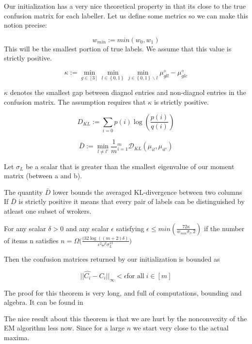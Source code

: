 Our initialization has a very nice theoretical property in that its close to the true confusion matrix for each labeller. Let us define some metrics so we can make this notion precise:

$$ w_{min} := min(w_{0}, w_{1}) $$
This will be the smallest portion of true labels. We assume that this value is strictly positive.

$$ \kappa := \min_{g \in [3]} \min_{l \in \left\{0,1\right\}} \min_{j \in \left\{0,1\right\}\backslash l}  \mu^{\diamond}_{gll} - \mu^{\diamond}_{glc}$$

$\kappa$ denotes the smallest gap between diagnol entries and non-diagnol entries in the confusion matrix. The assumption requires that $\kappa$ is strictly positive.

$$D_{KL} := \displaystyle\sum\limits_{i=0} p(i)\log(\frac{p(i)}{q(i)}) $$

$$\bar{D} := \min_{l \neq l'} \frac{1}{m} \displaystyle_{i=1}^{m} \mathcal{D}_{KL}(\mu_{il},\mu_{il'})$$

Let $\sigma_{L}$ be a scalar that is greater than the smallest eigenvalue of our moment matrix (between a and b).

The quantity $\bar{D}$ lower bounds the averaged KL-divergence between two columns If $\bar{D}$ is strictly positive it means that every pair of labels can be distinguished by atleast one subset of wrokers.


\begin{theorem}
For any scalar $\delta > 0$ and any scalar $\epsilon$ satisfying $\epsilon\leq min(\frac{72\kappa}{w_{min}\sigma_{l}, 2})$ if the number of 
items n satisfies $ n = \Omega\Big ( \frac{(32\log((m + 2){\delta})}{\epsilon^{2}\omega^{2}\sigma_{L}^{13}} \Big ) $

Then the confusion matrices returned by our initialization is bounded as

$$ ||\hat{C_{i}} - C_{i}||_{\infty}  < \epsilon \text{for all} \; i \in  [m] $$

The proof for this theorem is very long, and full of computations, bounding and algebra. It can be found in \cite{zhang2014spectral}
\end{theorem}

The nice result about this theorem is that we are hurt by the nonconvexity of the EM algorithm less now. Since for a large $n$ we start very close to the actual maxima.





